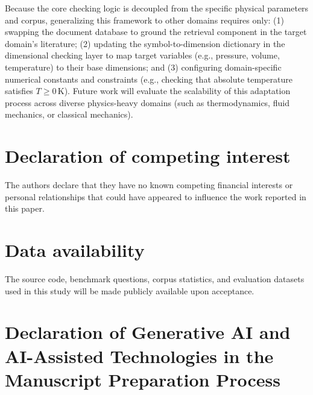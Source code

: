 \documentclass[a4paper,fleqn]{cas-sc}
\begin{document}
Because the core checking logic is decoupled from the specific physical parameters and corpus, generalizing this framework to other domains requires only: (1) swapping the document database to ground the retrieval component in the target domain's literature; (2) updating the symbol-to-dimension dictionary in the dimensional checking layer to map target variables (e.g., pressure, volume, temperature) to their base dimensions; and (3) configuring domain-specific numerical constants and constraints (e.g., checking that absolute temperature satisfies $T \ge 0$\,K). Future work will evaluate the scalability of this adaptation process across diverse physics-heavy domains (such as thermodynamics, fluid mechanics, or classical mechanics).

% 
\printcredits

\section*{Declaration of competing interest}
The authors declare that they have no known competing financial interests or personal relationships that could have appeared to influence the work reported in this paper.

\section*{Data availability}
The source code, benchmark questions, corpus statistics, and evaluation datasets used in this study will be made publicly available upon acceptance.

\section*{Declaration of Generative AI and AI-Assisted Technologies in the Manuscript Preparation Process}
\end{document}
